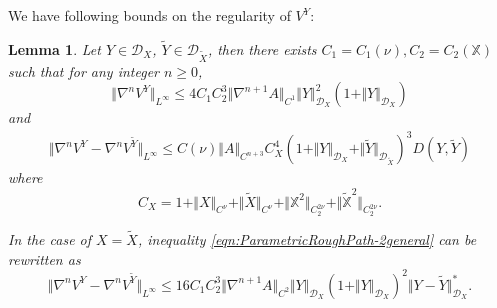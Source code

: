 \documentclass[11pt,a4paper,reqno]{amsart}%
\theoremstyle{plain}
\theoremstyle{remark}
\theoremstyle{plain}
\newtheorem{lemma}[theorem]{Lemma}
\numberwithin{equation}{section}
\begin{document}
 We have following bounds on the regularity of $V^Y$:
\begin{lemma}\label{lem:ParametricRoughPath}
Let $Y\in \mathcal{D}_X$, $\tilde{Y}\in \mathcal{D}_{\tilde{X}}$,
then there exists $C_1=C_1(\nu),C_2=C_2(\mathbb{X})$ such that for
any integer $n\geq 0$,
\begin{equation}
\Vert \nabla^nV^Y\Vert_{L^{\infty}}\leq
4C_1C_2^3\Vert \nabla^{n+1}A\Vert_{C^1}\Vert Y\Vert_{\mathcal{D}_X}^2(1+\Vert Y\Vert_{\mathcal{D}_X})\label{eqn:ParametricRoughPath-1}
\end{equation}
and
\begin{multline}\label{eqn:ParametricRoughPath-2general}
\Vert \nabla^nV^Y-\nabla^nV^{\tilde{Y}}\Vert_{L^{\infty}}\leq
C(\nu)\Vert A\Vert_{C^{n+3}}C_X^4(1+\Vert Y\Vert_{\mathcal{D}_X}+\Vert \tilde{Y}\Vert_{\mathcal{D}_{\tilde{X}}})^3 D(Y,\tilde{Y})
\end{multline}
where
$$
C_X=1+\Vert X\Vert_{C^{\nu}}+\Vert \tilde{X}\Vert_{C^{\nu}}+\Vert \mathbb{X}^2\Vert_{C_2^{2\nu}}+\Vert \mathbb{\tilde{X}}^2\Vert_{C_2^{2\nu}}.
$$

In the case of $X=\tilde{X}$, inequality \eqref{eqn:ParametricRoughPath-2general} can be rewritten as
\begin{equation}
\Vert \nabla^nV^Y-\nabla^nV^{\tilde{Y}}\Vert_{L^{\infty}}\leq
16C_1C_2^3\Vert \nabla^{n+1}A\Vert_{C^2}\Vert Y\Vert_{\mathcal{D}_X}(1+\Vert Y\Vert_{\mathcal{D}_X})^2\Vert Y-\tilde{Y}\Vert_{\mathcal{D}_X}^*.
\label{eqn:ParametricRoughPath-2}
\end{equation}
\end{lemma}
\end{document}
